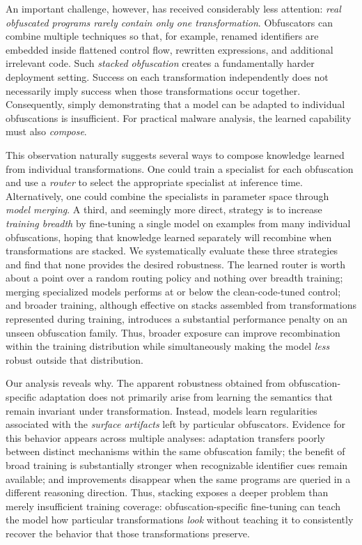 
An important challenge, however, has received considerably less
attention: \emph{real obfuscated programs rarely contain only one
transformation}. Obfuscators can combine multiple techniques so that,
for example, renamed identifiers are embedded inside flattened control
flow, rewritten expressions, and additional irrelevant code. Such
\emph{stacked obfuscation} creates a fundamentally harder deployment
setting. Success on each transformation independently does not
necessarily imply success when those transformations occur together.
Consequently, simply demonstrating that a model can be adapted to
individual obfuscations is insufficient. For practical malware
analysis, the learned capability must also \emph{compose}.

This observation naturally suggests several ways to compose knowledge
learned from individual transformations. One could train a specialist
for each obfuscation and use a \emph{router} to select the appropriate
specialist at inference time. Alternatively, one could combine the
specialists in parameter space through \emph{model merging}. A third,
and seemingly more direct, strategy is to increase \emph{training
breadth} by fine-tuning a single model on examples from many individual
obfuscations, hoping that knowledge learned separately will recombine
when transformations are stacked. We systematically evaluate these
three strategies and find that none provides the desired robustness.
The learned router is worth about a point over a random routing policy
and nothing over breadth training; merging specialized models performs at
or below the clean-code-tuned control; and broader training, although effective on stacks assembled
from transformations represented during training, introduces a
substantial performance penalty on an unseen obfuscation
family. Thus, broader exposure can improve recombination within the
training distribution while simultaneously making the model
\emph{less} robust outside that distribution.

Our analysis reveals why. The apparent robustness obtained from
obfuscation-specific adaptation does not primarily arise from learning
the semantics that remain invariant under transformation. Instead,
models learn regularities associated with the \emph{surface artifacts}
left by particular obfuscators. Evidence for this behavior appears
across multiple analyses: adaptation transfers poorly between distinct
mechanisms within the same obfuscation family; the benefit of broad
training is substantially stronger when recognizable identifier cues
remain available; and improvements disappear when the same programs
are queried in a different reasoning direction. Thus, stacking exposes
a deeper problem than merely insufficient training coverage:
obfuscation-specific fine-tuning can teach the model how particular
transformations \emph{look} without teaching it to consistently recover
the behavior that those transformations preserve.


